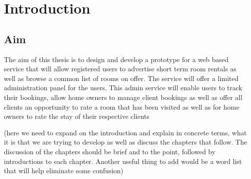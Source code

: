 \chapter*{Introduction}

\section*{Aim}
The aim of this thesis is to design and develop a prototype for a web based service that will allow registered users to advertise short term room rentals as well as browse a common list of rooms on offer. The service will offer a limited administration panel for the users. This admin service will enable users to track their bookings, allow home owners to manage client bookings as well as offer all clients an opportunity to rate a room that has been visited as well as for home owners to rate the stay of their respective clients

(here we need to expand on the introduction and explain in concrete terms, what it is that we are trying to develop as well as discuss the chapters that follow. The discussion of the chapters should be brief and to the point, followed by introductions to each chapter. Another useful thing to add would be a word list that will help eliminate some confusion)